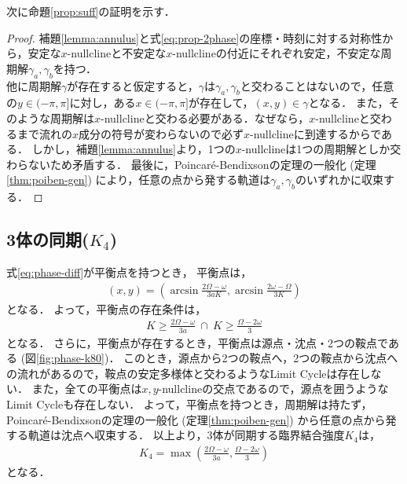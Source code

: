 \documentclass[../main]{subfiles}
\begin{document}
    次に命題\ref{prop:suff}の証明を示す．
    \begin{proof}
        補題\ref{lemma:annulus}と式\eqref{eq:prop-2phase}の座標・時刻に対する対称性から，安定な$x$-nullclineと不安定な$x$-nullclineの付近にそれぞれ安定，不安定な周期解$\gamma_a,\gamma_b$を持つ．\\
        他に周期解$\gamma$が存在すると仮定すると，$\gamma$は$\gamma_a,\gamma_b$と交わることはないので，任意の$y\in(-\pi,\pi]$に対し，ある$x\in(-\pi,\pi]$が存在して，$(x,y)\in\gamma$となる．
        また，そのような周期解は$x$-nullclineと交わる必要がある．なぜなら，$x$-nullclineと交わるまで流れの$x$成分の符号が変わらないので必ず$x$-nullclineに到達するからである．
        しかし，補題\ref{lemma:annulus}より，1つの$x$-nullclineは1つの周期解としか交わらないため矛盾する．
        最後に，Poincaré-Bendixsonの定理の一般化 (定理\ref{thm:poiben-gen}) により，任意の点から発する軌道は$\gamma_a,\gamma_b$のいずれかに収束する．
    \end{proof}

    \subsection{3体の同期($K_4$)}
    \label{sec:3body-k4}
    式\eqref{eq:phase-diff}が平衡点を持つとき，
    平衡点は，
    \begin{align*}
        (x,y)=\left(\arcsin \frac{2\Omega-\omega}{3aK},\arcsin \frac{2\omega-\Omega}{3K}\right)
    \end{align*}
    となる．
    よって，平衡点の存在条件は，
    \begin{align*}
        K\geq \frac{2\Omega-\omega}{3a}\ \cap \ K\geq \frac{\Omega-2\omega}{3}
    \end{align*}
    となる．
    さらに，平衡点が存在するとき，平衡点は源点・沈点・2つの鞍点である (図\ref{fig:phase-k80})．
    このとき，源点から2つの鞍点へ，2つの鞍点から沈点への流れがあるので，鞍点の安定多様体と交わるようなLimit Cycleは存在しない．
    また，全ての平衡点は$x,y$-nullclineの交点であるので，源点を囲うようなLimit Cycleも存在しない．
    よって，平衡点を持つとき，周期解は持たず，Poincaré-Bendixsonの定理の一般化 (定理\ref{thm:poiben-gen}) から任意の点から発する軌道は沈点へ収束する．
    以上より，3体が同期する臨界結合強度$K_4$は，
    \begin{align*}
        K_4=\max\left(\frac{2\Omega-\omega}{3a},\frac{\Omega-2\omega}{3}\right)
    \end{align*}
    となる．
    
\end{document}
